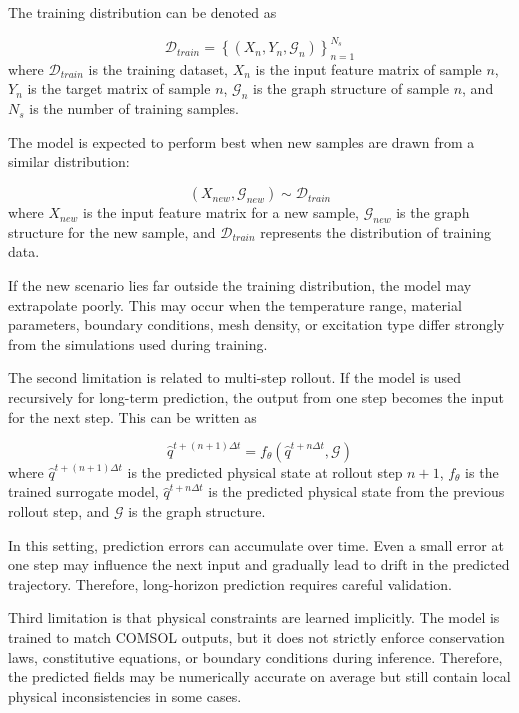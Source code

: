 The training distribution can be denoted as

\begin{equation}
\mathcal{D}_{train}
=
\left\{
\left(
X_n,
Y_n,
\mathcal{G}_n
\right)
\right\}_{n=1}^{N_s}
\end{equation}
where \(\mathcal{D}_{train}\) is the training dataset, \(X_n\) is the input feature matrix of sample \(n\), \(Y_n\) is the target matrix of sample \(n\), \(\mathcal{G}_n\) is the graph structure of sample \(n\), and \(N_s\) is the number of training samples.

The model is expected to perform best when new samples are drawn from a similar distribution:

\begin{equation}
\left(
X_{new},
\mathcal{G}_{new}
\right)
\sim
\mathcal{D}_{train}
\end{equation}
where \(X_{new}\) is the input feature matrix for a new sample, \(\mathcal{G}_{new}\) is the graph structure for the new sample, and \(\mathcal{D}_{train}\) represents the distribution of training data.

If the new scenario lies far outside the training distribution, the model may extrapolate poorly. This may occur when the temperature range, material parameters, boundary conditions, mesh density, or excitation type differ strongly from the simulations used during training.

The second limitation is related to multi-step rollout. If the model is used recursively for long-term prediction, the output from one step becomes the input for the next step. This can be written as

\begin{equation}
\hat{q}^{t+(n+1)\Delta t}
=
f_{\theta}
\left(
\hat{q}^{t+n\Delta t},
\mathcal{G}
\right)
\end{equation}
where \(\hat{q}^{t+(n+1)\Delta t}\) is the predicted physical state at rollout step \(n+1\), \(f_{\theta}\) is the trained surrogate model, \(\hat{q}^{t+n\Delta t}\) is the predicted physical state from the previous rollout step, and \(\mathcal{G}\) is the graph structure.

In this setting, prediction errors can accumulate over time. Even a small error at one step may influence the next input and gradually lead to drift in the predicted trajectory. Therefore, long-horizon prediction requires careful validation.

Third limitation is that physical constraints are learned implicitly. The model is trained to match COMSOL outputs, but it does not strictly enforce conservation laws, constitutive equations, or boundary conditions during inference. Therefore, the predicted fields may be numerically accurate on average but still contain local physical inconsistencies in some cases.

